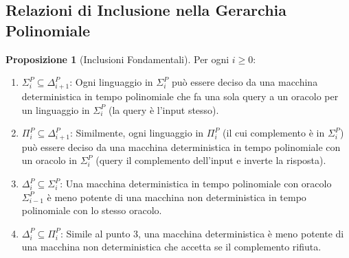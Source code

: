 \documentclass[a4paper]{article}
\theoremstyle{definition} %
\newtheorem{proposition}{Proposizione}
\begin{document}
\subsection{Relazioni di Inclusione nella Gerarchia Polinomiale}
\begin{proposition}[Inclusioni Fondamentali]
Per ogni $i \ge 0$:
\begin{enumerate}
    \item $\Sigma_i^P \subseteq \Delta_{i+1}^P$: Ogni linguaggio in $\Sigma_i^P$ può essere deciso da una macchina deterministica in tempo polinomiale che fa una sola query a un oracolo per un linguaggio in $\Sigma_i^P$ (la query è l'input stesso).
    \item $\Pi_i^P \subseteq \Delta_{i+1}^P$: Similmente, ogni linguaggio in $\Pi_i^P$ (il cui complemento è in $\Sigma_i^P$) può essere deciso da una macchina deterministica in tempo polinomiale con un oracolo in $\Sigma_i^P$ (query il complemento dell'input e inverte la risposta).
    \item $\Delta_i^P \subseteq \Sigma_i^P$: Una macchina deterministica in tempo polinomiale con oracolo $\Sigma_{i-1}^P$ è meno potente di una macchina non deterministica in tempo polinomiale con lo stesso oracolo.
    \item $\Delta_i^P \subseteq \Pi_i^P$: Simile al punto 3, una macchina deterministica è meno potente di una macchina non deterministica che accetta se il complemento rifiuta.
\end{enumerate}
\end{proposition}
\end{document}
